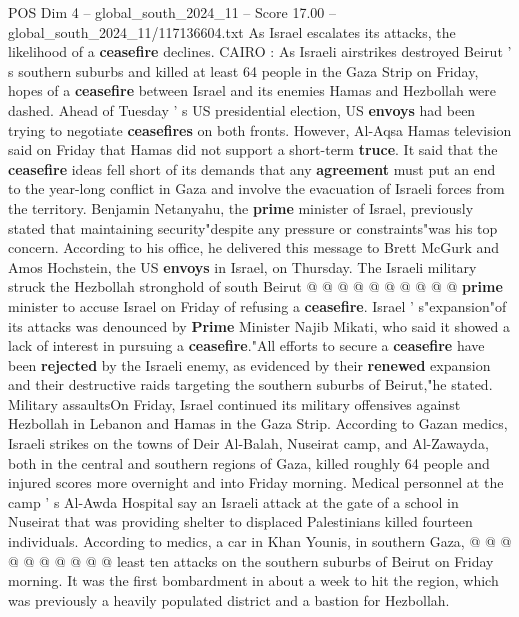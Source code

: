 \begin{textsample}{POS Dim 4 – global\_south\_2024\_11 – Score 17.00 – global\_south\_2024\_11/117136604.txt}  \label{ex:f4_pos_286}
As Israel escalates its attacks, the likelihood of a \textbf{ceasefire} declines.
CAIRO : As Israeli airstrikes destroyed Beirut ' s southern suburbs and killed at least 64 people in the Gaza Strip on Friday, hopes of a \textbf{ceasefire} between Israel and its enemies Hamas and Hezbollah were dashed.
Ahead of Tuesday ' s US presidential election, US \textbf{envoys} had been trying to negotiate \textbf{ceasefires} on both fronts.
However, Al-Aqsa Hamas television said on Friday that Hamas did not support a short-term \textbf{truce}.
It said that the \textbf{ceasefire} ideas fell short of its demands that any \textbf{agreement} must put an end to the year-long conflict in Gaza and involve the evacuation of Israeli forces from the territory.
Benjamin Netanyahu, the \textbf{prime} minister of Israel, previously stated that maintaining security"despite any pressure or constraints"was his top concern.
According to his office, he delivered this message to Brett McGurk and Amos Hochstein, the US \textbf{envoys} in Israel, on Thursday.
The Israeli military struck the Hezbollah stronghold of south Beirut @ @ @ @ @ @ @ @ @ @ \textbf{prime} minister to accuse Israel on Friday of refusing a \textbf{ceasefire}.
Israel ' s"expansion"of its attacks was denounced by \textbf{Prime} Minister Najib Mikati, who said it showed a lack of interest in pursuing a \textbf{ceasefire}."All efforts to secure a \textbf{ceasefire} have been \textbf{rejected} by the Israeli enemy, as evidenced by their \textbf{renewed} expansion and their destructive raids targeting the southern suburbs of Beirut,"he stated.
Military assaultsOn Friday, Israel continued its military offensives against Hezbollah in Lebanon and Hamas in the Gaza Strip.
According to Gazan medics, Israeli strikes on the towns of Deir Al-Balah, Nuseirat camp, and Al-Zawayda, both in the central and southern regions of Gaza, killed roughly 64 people and injured scores more overnight and into Friday morning.
Medical personnel at the camp ' s Al-Awda Hospital say an Israeli attack at the gate of a school in Nuseirat that was providing shelter to displaced Palestinians killed fourteen individuals.
According to medics, a car in Khan Younis, in southern Gaza, @ @ @ @ @ @ @ @ @ @ least ten attacks on the southern suburbs of Beirut on Friday morning.
It was the first bombardment in about a week to hit the region, which was previously a heavily populated district and a bastion for Hezbollah.

\end{textsample}
